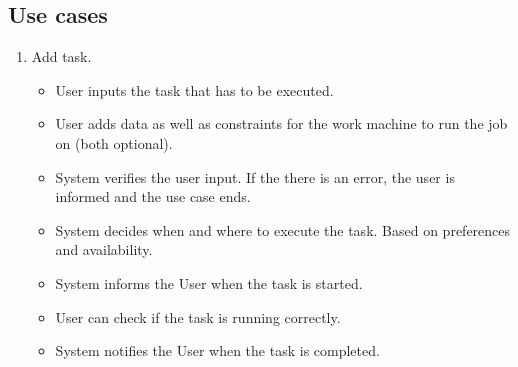 \subsection{Use cases}
\begin{enumerate}
  \item Add task.
  \begin{itemize}
    \item User inputs the task that has to be executed.
    \item User adds data as well as constraints for the work machine to run the job on (both optional).
    \item System verifies the user input.
    If the there is an error, the user is informed and the use case ends.
    \item System decides when and where to execute the task.
    Based on preferences and availability.
    \item System informs the User when the task is started.
    \item User can check if the task is running correctly.
    \item System notifies the User when the task is completed.
  \end{itemize}
\end{enumerate}